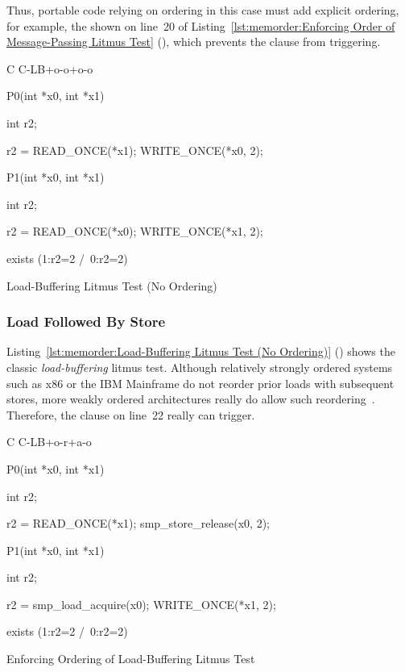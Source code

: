 Thus, portable code relying on ordering in this case must
add explicit ordering, for example, the  shown on
line~20 of
Listing~\ref{lst:memorder:Enforcing Order of Message-Passing Litmus Test}
(), which prevents
the  clause from triggering.

\begin{listing}[tbp]
{ \scriptsize
\begin{verbbox}[\LstLineNo]
C C-LB+o-o+o-o
{
}

P0(int *x0, int *x1)
{
  int r2;

  r2 = READ_ONCE(*x1);
  WRITE_ONCE(*x0, 2);
}


P1(int *x0, int *x1)
{
  int r2;

  r2 = READ_ONCE(*x0);
  WRITE_ONCE(*x1, 2);
}

exists (1:r2=2 /\ 0:r2=2)
\end{verbbox}
}
\centering
\theverbbox
\caption{Load-Buffering Litmus Test (No Ordering)}
\label{lst:memorder:Load-Buffering Litmus Test (No Ordering)}
\end{listing}

\subsubsection{Load Followed By Store}
Listing~\ref{lst:memorder:Load-Buffering Litmus Test (No Ordering)}
()
shows the classic \emph{load-buffering} litmus test.
Although relatively strongly ordered systems such as x86
or the IBM Mainframe do not reorder prior loads with subsequent stores,
more weakly ordered architectures really do allow such
reordering~\cite{JadeAlglave2011ppcmem}.
Therefore, the  clause on line~22 really can trigger.

\begin{listing}[tbp]
{ \scriptsize
\begin{verbbox}[\LstLineNo]
C C-LB+o-r+a-o
{
}

P0(int *x0, int *x1)
{
  int r2;

  r2 = READ_ONCE(*x1);
  smp_store_release(x0, 2);
}


P1(int *x0, int *x1)
{
  int r2;

  r2 = smp_load_acquire(x0);
  WRITE_ONCE(*x1, 2);
}

exists (1:r2=2 /\ 0:r2=2)
\end{verbbox}
}
\centering
\theverbbox
\caption{Enforcing Ordering of Load-Buffering Litmus Test}
\label{lst:memorder:Enforcing Ordering of Load-Buffering Litmus Test}
\end{listing}

